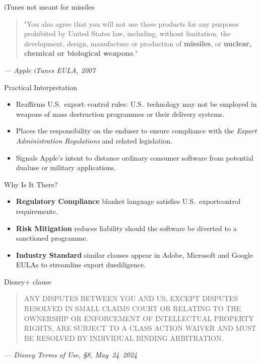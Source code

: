 \begin{frame}{iTunes not meant for missiles}
  \small
  \begin{quote}
    "You also agree that you will not use these products for any purposes prohibited by United States law, including, without limitation, the development, design, manufacture or production of \textbf{missiles}, or \textbf{nuclear, chemical or biological weapons}."
  \end{quote}
  \mbox{}\hfill\textit{--- Apple iTunes EULA, 2007} \cite{ITunes}
\end{frame}


\begin{frame}{Practical Interpretation}
  \begin{itemize}
    \item Reaffirms U.S.\ export--control rules: U.S.\ technology may not be employed in weapons of mass destruction programmes or their delivery systems.
    \item Places the responsibility on the end\textemdash{}user to ensure compliance with the \emph{Export Administration Regulations} and related legislation.
    \item Signals Apple's intent to distance ordinary consumer software from potential dual\textemdash{}use or military applications.
  \end{itemize}
\end{frame}

\begin{frame}{Why Is It There?}
  \begin{itemize}
    \item \textbf{Regulatory Compliance} \textemdash{} blanket language satisfies U.S.\ export\textendash{}control requirements.
    \item \textbf{Risk Mitigation} \textemdash{} reduces liability should the software be diverted to a sanctioned programme.
    \item \textbf{Industry Standard} \textemdash{} similar clauses appear in Adobe, Microsoft and Google EULAs to streamline export due\textemdash{}diligence.
  \end{itemize}
\end{frame}

\begin{frame}{Disney+ clause}
  \small
  \begin{quote}
    ANY DISPUTES BETWEEN YOU AND US, EXCEPT DISPUTES RESOLVED IN SMALL CLAIMS COURT OR RELATING TO THE OWNERSHIP OR ENFORCEMENT OF INTELLECTUAL PROPERTY RIGHTS, ARE SUBJECT TO A CLASS ACTION WAIVER AND MUST BE RESOLVED BY INDIVIDUAL BINDING ARBITRATION.
  \end{quote}
  \mbox{}\hfill\textit{--- Disney Terms of Use, §8, May~24~2024}
\end{frame}

